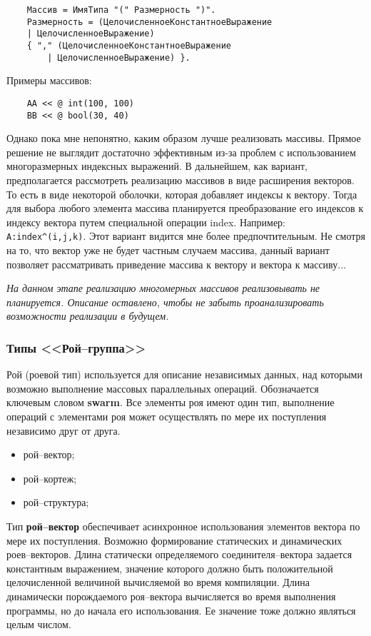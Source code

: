 {\begin{verbatim}
    Массив = ИмяТипа "(" Размерность ")".
    Размерность = (ЦелочисленноеКонстантноеВыражение
    | ЦелочисленноеВыражение)
    { "," (ЦелочисленноеКонстантноеВыражение
        | ЦелочисленноеВыражение) }.
\end{verbatim}


Примеры массивов:

\begin{verbatim}
    AA << @ int(100, 100)
    BB << @ bool(30, 40)
\end{verbatim}

Однако пока мне непонятно, каким образом лучше реализовать массивы. Прямое решение не выглядит достаточно эффективным из-за проблем с использованием многоразмерных индексных выражений. В дальнейшем, как вариант, предполагается рассмотреть реализацию массивов в виде расширения векторов. То есть в виде некоторой оболочки, которая добавляет индексы к вектору. Тогда для выбора любого элемента массива планируется преобразование его индексов к индексу вектора путем специальной операции index. Например: \verb|A:index^(i,j,k)|. Этот вариант видится мне более предпочтительным. Не смотря на то, что вектор уже не будет частным случаем массива, данный вариант позволяет рассматривать приведение массива к вектору и вектора к массиву...

\textit{На данном этапе реализацию многомерных массивов реализовывать не планируется. Описание оставлено, чтобы не забыть проанализировать возможности реализации в будущем.}

\subsubsection{Типы <<Рой--группа>>}

Рой (роевой тип) используется для описание независимых данных, над которыми возможно выполнение массовых параллельных операций. Обозначается ключевым словом \textbf{swarm}. Все элементы роя имеют один тип, выполнение операций с элементами роя может осуществлять по мере их поступления независимо друг от друга.

\begin{itemize}
    \item рой--вектор;
    \item рой--кортеж;
    \item рой--структура;
\end{itemize}

Тип \textbf{рой--вектор} обеспечивает асинхронное использования элементов вектора по мере их поступления. Возможно формирование статических и динамических роев--векторов. Длина статически определяемого соединителя--вектора задается константным выражением, значение которого должно быть положительной целочисленной величиной вычисляемой во время компиляции. Длина динамически порождаемого роя--вектора вычисляется во время выполнения программы, но до начала его использования. Ее значение тоже должно являться целым числом.

}
